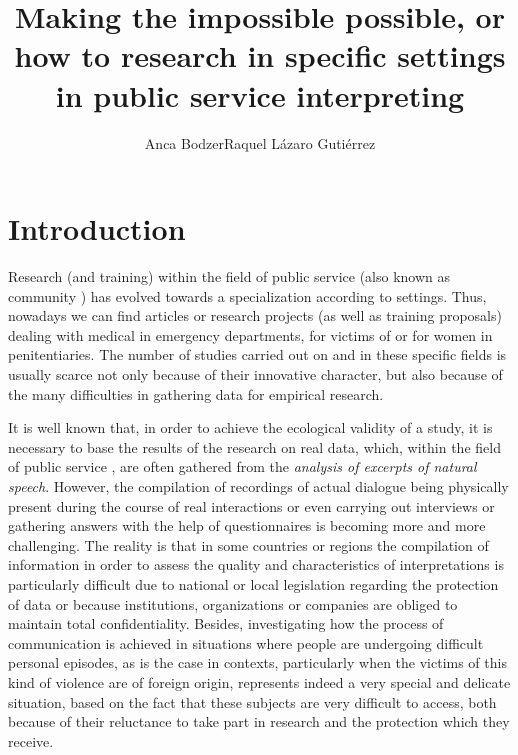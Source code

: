 \documentclass[output=paper]{LSP/langsci}
\title{Making the impossible possible, or how to research in specific settings in public service interpreting}
\author{Anca Bodzer\lastand Raquel Lázaro Gutiérrez\affiliation{Universidad de Alcalá}
}
\begin{document}
 
 
\section{Introduction}

Research (and training) within the field of public service  (also known as community ) has evolved towards a specialization according to settings. Thus, nowadays we can find articles or research projects (as well as training proposals) dealing with medical  in emergency departments,  for victims of  or  for women in penitentiaries. The number of studies carried out on  and  in these specific fields is usually scarce not only because of their innovative character, but also because of the many difficulties in gathering data for empirical research. 

It is well known that, in order to achieve the ecological validity of a study, it is necessary to base the results of the research on real data, which, within the field of public service , are often gathered from the \textit{analysis of excerpts of natural speech}. However, the compilation of recordings of actual dialogue being physically present during the course of real interactions or even carrying out interviews or gathering answers with the help of questionnaires is becoming more and more challenging. The reality is that in some countries or regions the compilation of information in order to assess the quality and characteristics of interpretations is particularly difficult due to national or local legislation regarding the protection of data or because institutions, organizations or companies are obliged to maintain total confidentiality. Besides, investigating how the process of communication is achieved in situations where people are undergoing difficult personal episodes, as is the case in  contexts, particularly when the victims of this kind of violence are of foreign origin, represents indeed a very special and delicate situation, based on the fact that these subjects are very difficult to access, both because of their reluctance to take part in research and the protection which they receive. 
\end{document}
